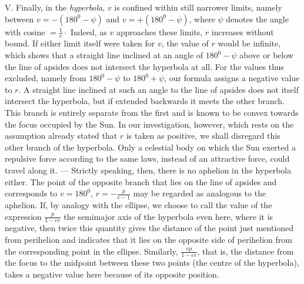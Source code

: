 V. Finally, in the \emph{hyperbola}, $v$ is confined within still narrower limits, namely between $v = -(180^0-\psi)$ and $v = +(180^0-\psi)$, where $\psi$ denotes the angle with cosine $= \frac{1}{e}\cdot$ Indeed, as $v$ approaches these limits, $r$ increases without bound. If either limit itself were taken for $v$, the value of $r$ would be infinite, which shows that a straight line inclined at an angle of $180^0-\psi$ above or below the line of apsides does not intersect the hyperbola at all. For the values thus excluded, namely from $180^0-\psi$ to $180^0+\psi$, our formula assigns a negative value to $r$. A straight line inclined at such an angle to the line of apsides does not itself intersect the hyperbola, but if extended backwards it meets the other branch. This branch is entirely separate from the first and is known to be convex towards the focus occupied by the Sun. In our investigation, however, which rests on the assumption already stated that $r$ is taken as positive, we shall disregard this other branch of the hyperbola. Only a celestial body on which the Sun exerted a repulsive force according to the same laws, instead of an attractive force, could travel along it. — Strictly speaking, then, there is no aphelion in the hyperbola either. The point of the opposite branch that lies on the line of apsides and corresponds to $v = 180^0$, $r = -\frac{p}{e-1}$ may be regarded as analogous to the aphelion. If, by analogy with the ellipse, we choose to call the value of the expression $\frac{p}{1-ee}$ the semimajor axis of the hyperbola even here, where it is negative, then twice this quantity gives the distance of the point just mentioned from perihelion and indicates that it lies on the opposite side of perihelion from the corresponding point in the ellipse. Similarly, $\frac{ep}{1-ee}$, that is, the distance from the focus to the midpoint between these two points (the centre of the hyperbola), takes a negative value here because of its opposite position.
